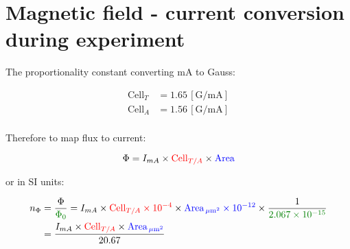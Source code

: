 
\section*{Magnetic field - current conversion during experiment}
The proportionality constant converting mA to Gauss:

\begin{equation}\label{eq:gauss_coil}
  \begin{aligned}
    \text{Cell}_T & = 1.65\,\left[\text{G/mA} \right]\\
    \text{Cell}_A & = 1.56\,\left[\text{G/mA} \right]\\
  \end{aligned}
\end{equation}

\noindent Therefore to map flux to current:

\begin{equation}
  \Phi = I_{mA} \times {\color{red}{\text{Cell}_{T/A}}} \times {\color{blue}{\text{Area}}}
\end{equation}

\begin{framed}\noindent
  \noindent or in SI units:

  \begin{equation}
    \begin{aligned}
      n_{\Phi} & = \frac{\Phi}{\green{\Phi_{0}}} = I_{mA} \times \red{\text{Cell}_{T/A} \times 10^{-4}} \times
      \blue{\text{Area}_{\mum^2} \times 10^{-12}} \times \frac{1}{\green{2.067 \times 10^{-15}}}\\
      & = \frac{I_{mA} \times \red{\text{Cell}_{T/A}} \times \blue{\text{Area}_{\mum^2}}}{20.67}
    \end{aligned}
  \end{equation}
\end{framed}
